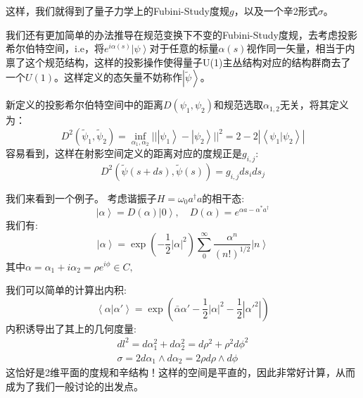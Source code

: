 \documentclass[supercite]{HustGraduPaper}
\newcommand{\ket}[1]{\left| #1 \right\rangle}
\newcommand{\bracket}[2]{\left\langle #1|#2 \right\rangle}
\begin{document}
这样，我们就得到了量子力学上的Fubini-Study度规$g$，以及一个辛2形式$\sigma$。

我们还有更加简单的办法推导在规范变换下不变的Fubini-Study度规，去考虑投影希尔伯特空间，i.e，将$e^{i\alpha(s)}\ket{\psi}$对于任意的标量$\alpha(s)$视作同一矢量，相当于内禀了这个规范结构，这样的投影操作使得量子U(1)主丛结构对应的结构群商去了一个$U(1)$。这样定义的态矢量不妨称作$\ket{\tilde{\psi}}$。

新定义的投影希尔伯特空间中的距离$D(\psi_1,\psi_2)$和规范选取$\alpha_{1,2}$无关，将其定义为：
\begin{equation}
D^2(\tilde{\psi}_1,\tilde{\psi}_2) = \inf_{\alpha_1,\alpha_2}||\ket{\psi_1} - \ket{\psi_2}||^2 = 2 - 2|\bracket{\psi_1}{\psi_2}|
\end{equation}
容易看到，这样在射影空间定义的距离对应的度规正是$g_{i,j}$:
\begin{equation}
D^2(\tilde{\psi}(s+ds),\tilde{\psi}(s))  = g_{i,j} ds_i ds_j
\end{equation}

我们来看到一个例子。 考虑谐振子$H = \omega_0 a^\dagger a$的相干态:
\begin{equation}
\ket{\alpha} = D(\alpha) \ket{0}, \quad D(\alpha) = e^{\alpha a - \alpha^* a^\dagger}
\end{equation}
我们有:
\begin{equation}
\ket{\alpha} = \exp(-\frac{1}{2} |\alpha|^2) \sum_0^{\infty} \frac{\alpha^n}{(n!)^{1/2}} \ket{n}
\end{equation}
其中$\alpha = \alpha_1 + i\alpha_2  = \rho e^{i\phi}\in C,$

我们可以简单的计算出内积:
\begin{equation}
\bracket{\alpha}{\alpha'} = \exp{(\bar{\alpha} \alpha' - \frac{1}{2} |\alpha|^2 - \frac{1}{2}|\alpha'^2|)}
\end{equation}
内积诱导出了其上的几何度量:
\begin{equation}
\label{eq:2-form}
\begin{aligned}
dl^2= d\alpha_1^2 + d\alpha_2^2 = d\rho^2 + \rho^2 d\phi^2\\
\sigma = 2 d\alpha_1 \wedge d\alpha_2 = 2 \rho d\rho \wedge d\phi
\end{aligned}
\end{equation}
这恰好是2维平面的度规和辛结构！这样的空间是平直的，因此非常好计算，从而成为了我们一般讨论的出发点。
\end{document}
